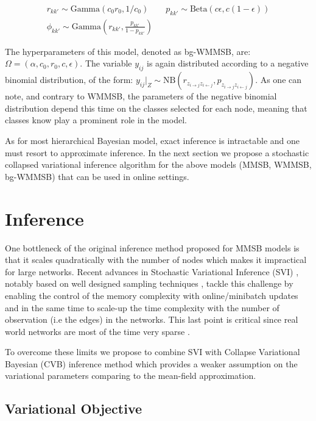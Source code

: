 \begin{gather*}
r_{kk'} \sim \textrm{Gamma}(c_0r_0, 1/c_0) \qquad p_{kk'} \sim \textrm{Beta}(c\epsilon, c(1-\epsilon)) \\
\phi_{kk'} \sim \textrm{Gamma}(r_{kk'}, \frac{p_{kk'}}{1-p_{kk'}})
\end{gather*}

The hyperparameters of this model, denoted as bg-WMMSB, are: $\Omega = (\alpha, c_0, r_0, c, \epsilon)$. The variable $y_{ij}$ is again distributed according to a negative binomial distribution, of the form: $y_{ij}|_{Z} \sim \textrm{NB}(r_{z_{i \rightarrow j} z_{i \leftarrow j}},p_{z_{i \rightarrow j} z_{i \leftarrow j}})$. As one can note, and contrary to WMMSB, the parameters of the negative binomial distribution depend this time on the classes selected for each node, meaning that classes know play a prominent role in the model.

As for most hierarchical Bayesian model, exact inference is intractable and one must resort to approximate inference. In the next section we propose a stochastic collapsed variational inference algorithm for the above models (MMSB, WMMSB, bg-WMMSB) that can be used in online settings.

\section{Inference}

One bottleneck of the original inference method proposed for MMSB models is that it scales quadratically with the number of nodes which makes it impractical for large networks. Recent advances in Stochastic Variational Inference (SVI) \cite{hoffman2013stochastic}, notably based on well designed sampling techniques \cite{gopalan2013efficient}\cite{kim2013efficient}, tackle this challenge by enabling the control of the memory complexity with online/minibatch updates and in the same time to scale-up the time complexity with the number of observation (i.e the edges) in the networks. This last point is critical since real world networks are most of the time very sparse \cite{barabasi_burst}. 

To overcome these limits we propose to combine SVI with Collapse Variational Bayesian (CVB) inference method \cite{teh2006collapsed} which provides a weaker assumption on the variational parameters comparing to the mean-field approximation.


\subsection{Variational Objective}

